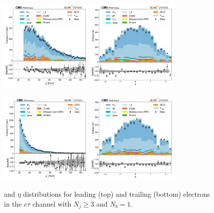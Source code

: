 \begin{figure}[htb!]
    \centering
    \includegraphics[width=0.4\textwidth]{chapters/Analysis/sectionPlots/figures/data_mc_overlays/etau_2016_cat_gt3_eq1_signal_linear_lepton_lepton1_pt}
    \includegraphics[width=0.4\textwidth]{chapters/Analysis/sectionPlots/figures/data_mc_overlays/etau_2016_cat_gt3_eq1_signal_linear_lepton_lepton1_eta}

    \includegraphics[width=0.4\textwidth]{chapters/Analysis/sectionPlots/figures/data_mc_overlays/etau_2016_cat_gt3_eq1_signal_linear_lepton_lepton2_pt}
    \includegraphics[width=0.4\textwidth]{chapters/Analysis/sectionPlots/figures/data_mc_overlays/etau_2016_cat_gt3_eq1_signal_linear_lepton_lepton2_eta}
    \caption{\pt and $\eta$ distributions for leading (top) and trailing
        (bottom) electrons in the $e\tau$ channel with $N_{j} \geq 3$ and
        $N_{b} = 1$.}
    \label{fig:analysis:plots:etau_7_kinematic}
\end{figure}

